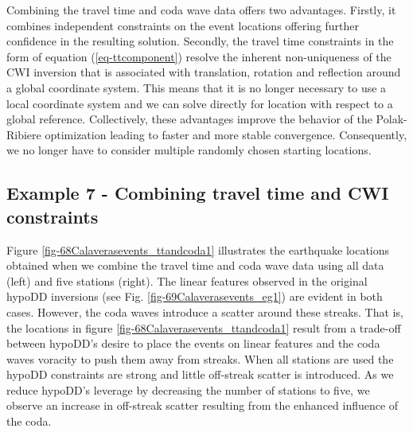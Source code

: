 \documentclass[extra, onecolumn, doublespacing]{gji}
\begin{document}
Combining the travel time and coda wave data offers two advantages.
Firstly, it combines independent constraints on the event locations
offering further confidence in the resulting solution. Secondly, the
travel time constraints in the form of equation
(\ref{eq-ttcomponent}) resolve the inherent non-uniqueness
of the CWI inversion that is associated with translation, rotation and reflection around a global
coordinate system. This means that it is no longer necessary to use
a local coordinate system and we can solve directly for location
with respect to a global reference. Collectively, these advantages
improve the behavior of the Polak-Ribiere optimization leading to
faster and more stable convergence. Consequently, we no longer have
to consider multiple randomly chosen starting locations.


\subsection{Example 7 - Combining travel time and CWI constraints}
 Figure
\ref{fig-68Calaverasevents_ttandcoda1} illustrates the earthquake
locations obtained when we combine the travel time and coda wave
data using all data (left) and five stations (right). The linear
features observed in the original hypoDD inversions (see Fig.
\ref{fig-69Calaverasevents_eg1}) are evident in both cases. However,
the coda waves introduce a scatter around these streaks. That is,
the locations in figure \ref{fig-68Calaverasevents_ttandcoda1}
result from a trade-off between hypoDD's desire to place the events
on linear features and the coda waves voracity to push them away
from streaks. When all stations are used the hypoDD constraints are
strong and little off-streak scatter is introduced. As we reduce
hypoDD's leverage by decreasing the number of stations to five, we
observe an increase in off-streak scatter resulting from the
enhanced influence of the coda.

\end{document}
